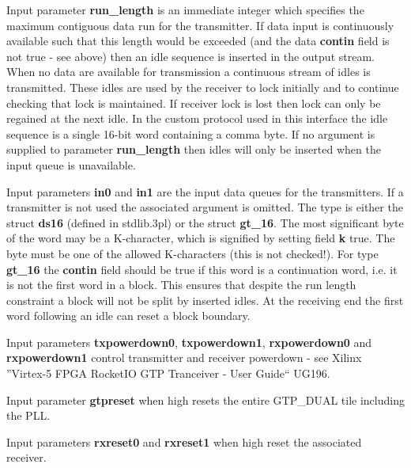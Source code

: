             Input parameter {\bf run\_length} is an immediate integer which
            specifies the maximum contiguous data run for the transmitter. If
            data input is continuously available such that this length would be
            exceeded (and the data {\bf contin} field is not true - see above)
            then an idle sequence is inserted in the output stream. When no data
            are available for transmission a continuous stream of idles is
            transmitted. These idles are used by the receiver to lock initially
            and to continue checking that lock is maintained. If receiver lock
            is lost then lock can only be regained at the next idle. In the
            custom protocol used in this interface the idle sequence is a single
            16-bit word containing a comma byte. If no argument is supplied
            to parameter {\bf run\_length} then idles will only be inserted
            when the input queue is unavailable.

            Input parameters {\bf in0} and {\bf in1} are the input data queues
            for the transmitters. If a transmitter is not used the associated
            argument is omitted. The type is either the struct {\bf ds16}
            (defined in stdlib.3pl) or the struct {\bf gt\_16}. The most
            significant byte of the word may be a K-character, which is
            signified by setting field {\bf k} true. The byte must be one of the
            allowed K-characters (this is not checked!). For type {\bf gt\_16}
            the {\bf contin} field should be true if this word is a continuation
            word, i.e. it is not the first word in a block. This ensures that
            despite the run length constraint a block will not be split by
            inserted idles. At the receiving end the first word following an
            idle can reset a block boundary.
            
            Input parameters {\bf txpowerdown0}, {\bf txpowerdown1}, {\bf
            rxpowerdown0} and {\bf rxpowerdown1} control transmitter and
            receiver powerdown - see Xilinx ''Virtex-5 FPGA RocketIO GTP Tranceiver -
            User Guide`` UG196.
            
            Input parameter {\bf gtpreset} when high resets the entire GTP\_DUAL
            tile including the PLL.
            
            Input parameters {\bf rxreset0} and {\bf rxreset1} when high reset
            the associated receiver.
            
